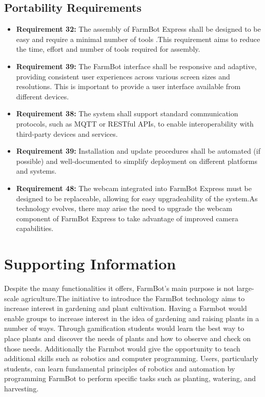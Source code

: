 \subsection{Portability Requirements}
\begin{itemize}
		\item \textbf{Requirement 32:}  The assembly of FarmBot Express shall be designed to be easy and require a minimal number of tools .This requirement aims to reduce the time, effort and number of tools required for assembly.
		\item \textbf{Requirement 39:} The FarmBot interface shall be responsive and adaptive, providing consistent user experiences across various screen sizes and resolutions. This is important to provide a user interface available from different devices.
		\item \textbf {Requirement 38:} The system shall support standard communication protocols, such as MQTT or RESTful APIs, to enable interoperability with third-party devices and services.
		\item \textbf{Requirement 39:} Installation and update procedures shall be automated (if possible) and well-documented to simplify deployment on different platforms and systems.
		\item \textbf{Requirement 48:} The webcam integrated into FarmBot Express must be designed to be replaceable, allowing for easy upgradeability of the system.As technology evolves, there may arise the need to upgrade the webcam component of FarmBot Express to take advantage of improved camera capabilities.
\end{itemize}

\section{Supporting Information}
Despite the many functionalities it offers, FarmBot's main purpose is not large-scale agriculture.The initiative to introduce the FarmBot technology aims to increase interest in gardening and plant cultivation. Having a Farmbot would enable groups to increase interest in the idea of gardening and raising plants in a number of ways. Through gamification students would learn the best way to place plants and discover the needs of plants and how to observe and check on those needs. Additionally the Farmbot would give the opportunity to teach additional skills such as robotics and computer programming. Users, particularly students, can learn fundamental principles of robotics and automation by programming FarmBot to perform specific tasks such as planting, watering, and harvesting.
